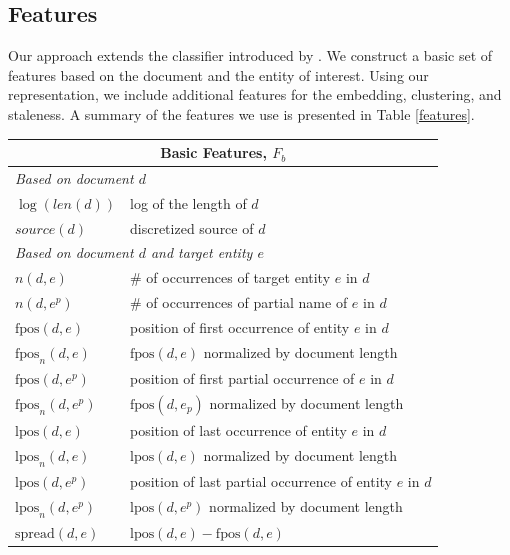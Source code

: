 \documentclass{sig-alternate}
\begin{document}
\subsection{Features}
\label{feat}

Our approach extends the classifier introduced by \citet{jingang13}.
We construct a basic set of features based on the document and the entity of interest.
Using our representation, we include additional features for the embedding, clustering, and staleness.
A summary of the features we use is presented in Table \ref{features}. 


\begin{table}[tb]
\center
{\small
\begin{tabular}{p{}p{}}
\toprule
\multicolumn{2}{c}{\textbf{Basic Features, $F_b$}} \\ %
\midrule
\multicolumn{2}{l}{\emph{Based on document $d$}} \\ %
$\log(len(d))$ & log of the length of $d$ \\ %
$source(d)$ & discretized source of $d$ \\
\multicolumn{2}{l}{\emph{Based on document $d$ and target entity $e$}} \\ %
$n(d,e)$ & \# of occurrences of target entity $e$ in $d$ \\
$n(d,e^p)$ & \# of occurrences of partial name of $e$ in $d$ \\
$\text{fpos}(d,e)$ & position of first occurrence of entity $e$ in $d$ \\
$\text{fpos}_n(d,e)$ & $\text{fpos}(d,e)$ normalized by document length \\
$\text{fpos}(d,e^p)$ & position of first partial occurrence of $e$ in $d$ \\
$\text{fpos}_n(d,e^p)$ & $\text{fpos}(d,e_p)$ normalized by document length \\
$\text{lpos}(d,e)$ & position of last occurrence of entity $e$ in $d$ \\
$\text{lpos}_n(d,e)$ & $\text{lpos}(d,e)$ normalized by document length \\
$\text{lpos}(d,e^p)$ & position of last partial occurrence of entity $e$ in $d$ \\
$\text{lpos}_n(d,e^p)$ & $\text{lpos}(d,e^p)$ normalized by document length \\ 
$\text{spread}(d,e)$ & $\text{lpos}(d,e) - \text{fpos}(d,e)$ \\

\end{tabular}}
\end{table}
\end{document}
